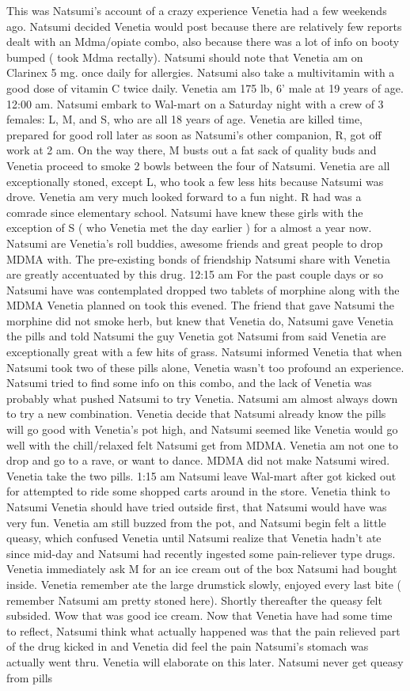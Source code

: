 \documentclass[12pt]{book}
\begin{document}
This was Natsumi's account of a crazy experience Venetia had a few weekends ago. Natsumi decided Venetia would post because there are relatively few reports dealt with an Mdma/opiate combo, also because there was a lot of info on booty bumped ( took Mdma rectally). Natsumi should note that Venetia am on Clarinex 5 mg. once daily for allergies. Natsumi also take a multivitamin with a good dose of vitamin C twice daily. Venetia am 175 lb, 6' male at 19 years of age. 12:00 am. Natsumi embark to Wal-mart on a Saturday night with a crew of 3 females: L, M, and S, who are all 18 years of age. Venetia are killed time, prepared for good roll later as soon as Natsumi's other companion, R, got off work at 2 am. On the way there, M busts out a fat sack of quality buds and Venetia proceed to smoke 2 bowls between the four of Natsumi. Venetia are all exceptionally stoned, except L, who took a few less hits because Natsumi was drove. Venetia am very much looked forward to a fun night. R had was a comrade since elementary school. Natsumi have knew these girls with the exception of S ( who Venetia met the day earlier ) for a almost a year now. Natsumi are Venetia's roll buddies, awesome friends and great people to drop MDMA with. The pre-existing bonds of friendship Natsumi share with Venetia are greatly accentuated by this drug. 12:15 am For the past couple days or so Natsumi have was contemplated dropped two tablets of morphine along with the MDMA Venetia planned on took this evened. The friend that gave Natsumi the morphine did not smoke herb, but knew that Venetia do, Natsumi gave Venetia the pills and told Natsumi the guy Venetia got Natsumi from said Venetia are exceptionally great with a few hits of grass. Natsumi informed Venetia that when Natsumi took two of these pills alone, Venetia wasn't too profound an experience. Natsumi tried to find some info on this combo, and the lack of Venetia was probably what pushed Natsumi to try Venetia. Natsumi am almost always down to try a new combination. Venetia decide that Natsumi already know the pills will go good with Venetia's pot high, and Natsumi seemed like Venetia would go well with the chill/relaxed felt Natsumi get from MDMA. Venetia am not one to drop and go to a rave, or want to dance. MDMA did not make Natsumi wired. Venetia take the two pills. 1:15 am Natsumi leave Wal-mart after got kicked out for attempted to ride some shopped carts around in the store. Venetia think to Natsumi Venetia should have tried outside first, that Natsumi would have was very fun. Venetia am still buzzed from the pot, and Natsumi begin felt a little queasy, which confused Venetia until Natsumi realize that Venetia hadn't ate since mid-day and Natsumi had recently ingested some pain-reliever type drugs. Venetia immediately ask M for an ice cream out of the box Natsumi had bought inside. Venetia remember ate the large drumstick slowly, enjoyed every last bite ( remember Natsumi am pretty stoned here). Shortly thereafter the queasy felt subsided. Wow that was good ice cream. Now that Venetia have had some time to reflect, Natsumi think what actually happened was that the pain relieved part of the drug kicked in and Venetia did feel the pain Natsumi's stomach was actually went thru. Venetia will elaborate on this later. Natsumi never get queasy from pills 
\end{document}
